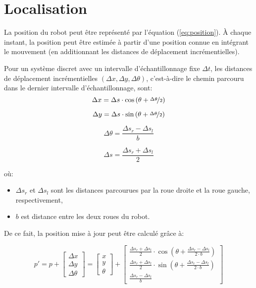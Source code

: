 \section{Localisation}

La position du robot peut être représenté par l'équation (\ref{eq:position}). À chaque instant, la position peut être estimée à partir d'une position connue en intégrant le mouvement (en additionnant les distances de déplacement incrémentielles).

Pour un système discret avec un intervalle d'échantillonnage fixe $\Delta t$, les distances de déplacement incrémentielles $\left ( \Delta x, \Delta y, \Delta \theta \right )$, c'est-à-dire le chemin parcouru dans le dernier intervalle d'échantillonnage, sont: 
\begin{equation}
    \Delta x = \Delta s \cdot \cos \left ( \theta + \nicefrac{\Delta \theta}{2} \right )
\end{equation}

\begin{equation}
    \Delta y = \Delta s \cdot \sin \left ( \theta + \nicefrac{\Delta \theta}{2} \right )
\end{equation}

\begin{equation}
    \Delta \theta = \frac{\Delta s_r - \Delta s_l}{b}
\end{equation}

\begin{equation}
    \Delta s = \frac{\Delta s_r + \Delta s_l}{2}
\end{equation}

où: 
\begin{itemize}
    \item $\Delta s_r$ et $\Delta s_l$ sont les distances parcourues par la roue droite et la roue gauche, respectivement,
    \item $b$ est distance entre les deux roues du robot.
\end{itemize}


De ce fait, la position mise à jour peut être calculé grâce à:

\begin{equation}
    p' = p + \left [
\begin{array}{l}
     \Delta x  \\
     \Delta y  \\
     \Delta \theta
\end{array}
    \right ] = \left [
\begin{array}{l}
     x  \\
     y  \\
     \theta
\end{array}
    \right ] + \left [
\begin{array}{c}
     \frac{\Delta s_r + \Delta s_l}{2} \cdot \cos \left ( \theta + \frac{\Delta s_r - \Delta s_l}{2\cdot b} \right )  \\
     \frac{\Delta s_r + \Delta s_l}{2} \cdot \sin \left ( \theta + \frac{\Delta s_r - \Delta s_l}{2\cdot b} \right )  \\
     \frac{\Delta s_r - \Delta s_l}{b}
\end{array}
    \right ]
\end{equation}